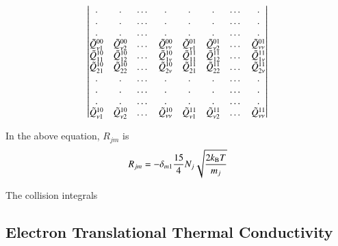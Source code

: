\documentclass{warpdoc}
\begin{document}
\begin{equation}
{\begin{vmatrix}
    . & . & \dots & . & . & . & \dots & . \\
    . & . & \dots & . & . & . & \dots & .  \\
    . & . & \dots & . & . & . & \dots & . \\
    \Tilde{Q}^{00}_{\nu 1} & \Tilde{Q}^{00}_{\nu 2} & \dots & \Tilde{Q}^{00}_{\nu \nu} & \Tilde{Q}^{01}_{\nu 1} & \Tilde{Q}^{01}_{\nu 2} & \dots & \Tilde{Q}^{01}_{\nu \nu} \\
    \Tilde{Q}^{10}_{11} & \Tilde{Q}^{10}_{12} & \dots & \Tilde{Q}^{10}_{1 \nu} & \Tilde{Q}^{11}_{11} & \Tilde{Q}^{11}_{12} & \dots & \Tilde{Q}^{11}_{1 \nu} \\
    \Tilde{Q}^{10}_{21} & \Tilde{Q}^{10}_{22} & \dots & \Tilde{Q}^{10}_{2 \nu} & \Tilde{Q}^{11}_{21} & \Tilde{Q}^{11}_{22} & \dots & \Tilde{Q}^{11}_{2 \nu} \\
    . & . & \dots & . & . & . & \dots & .  \\
    . & . & \dots & . & . & . & \dots & . \\
    . & . & \dots & . & . & . & \dots & . \\
    \Tilde{Q}^{10}_{\nu 1} & \Tilde{Q}^{10}_{\nu 2} & \dots & \Tilde{Q}^{10}_{\nu \nu} & \Tilde{Q}^{11}_{\nu 1} & \Tilde{Q}^{11}_{\nu 2} & \dots & \Tilde{Q}^{11}_{\nu \nu}
    \end{vmatrix}}
\end{equation}

In the above equation, $R_{jm}$ is 
\begin{equation}
  R_{jm}=-\delta_{m1}\frac{15}{4}N_j\sqrt{\frac{2 k_{\rm B} T}{m_j}}
\end{equation}

The collision integrals





\subsection{Electron Translational Thermal Conductivity}
\end{document}

